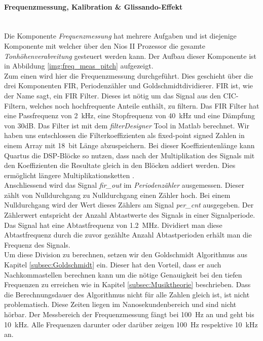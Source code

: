 \newpage

\paragraph{Frequenzmessung, Kalibration \& Glissando-Effekt}\mbox{}\\

Die Komponente \textit{Frequenzmessung} hat mehrere Aufgaben und ist diejenige Komponente mit welcher über den Nios II Prozessor die gesamte \textit{Tonhöhenverabreitung} gesteuert werden kann. Der Aufbau dieser Komponente ist in Abbildung \ref{img:freq_meas_pitch} aufgezeigt.\\
Zum einen wird hier die Frequenzmessung durchgeführt. Dies geschieht über die drei Komponenten FIR, Periodenzähler und Goldschmidtdividierer. FIR ist, wie der Name sagt, ein FIR Filter. Dieses ist nötig um das Signal aus den CIC-Filtern, welches noch hochfrequente Anteile enthält, zu filtern. Das FIR Filter hat eine Passfrequenz von \SI{2}{kHz}, eine Stopfrequenz von \SI{40}{kHz} und eine Dämpfung von 30dB. Das Filter ist mit dem \textit{filterDesigner} Tool in Matlab berechnet. Wir haben uns entschlossen die Filterkoeffizienten als fixed-point signed Zahlen in einem Array mit \SI{18}{bit} Länge abzuspeichern. Bei dieser Koeffizientenlänge kann Quartus die DSP-Blöcke so nutzen, dass nach der Multiplikation des Signals mit den Koeffizienten die Resultate gleich in den Blöcken addiert werden. Dies ermöglicht längere Multiplikationsketten \cite{Cyclone_V}.\\
Anschliessend wird das Signal \textit{fir\_out} im \textit{Periodenzähler} ausgemessen. Dieser zählt von Nulldurchgang zu Nulldurchgang einen Zähler hoch. Bei einem Nulldurchgang wird der Wert dieses Zählers am Signal \textit{per\_cnt} ausgegeben. Der Zählerwert entspricht der Anzahl Abtastwerte des Signals in einer Signalperiode. \\
Das Signal hat eine Abtastfrequenz von \SI{1.2}{MHz}. Dividiert man diese Abtastfrequenz durch die zuvor gezählte Anzahl Abtastperioden erhält man die Frequenz des Signals.\\ Um diese Division zu berechnen, setzen wir den Goldschmidt Algorithmus aus Kapitel \ref{subsec:Goldschmidt} ein. Dieser hat den Vorteil, dass er auch Nachkommastellen berechnen kann um die nötige Genauigkeit bei den tiefen Frequenzen zu erreichen wie in Kapitel \ref{subsec:Musiktheorie} beschrieben. Dass die Berechnungsdauer des Algorithmus nicht für alle Zahlen gleich ist, ist nicht problematisch. Diese Zeiten liegen im Nanosekundenbereich und sind nicht hörbar. Der Messbereich der Frequenzmessung fängt bei \SI{100}{Hz} an und geht bis \SI{10}{kHz}. Alle Frequenzen darunter oder darüber zeigen \SI{100}{Hz} respektive \SI{10}{kHz} an.

